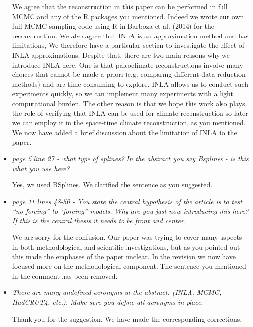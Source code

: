 \documentclass[11pt]{article}
\newcommand{\bl}[1]{\color{red}\textbf{[Bo: #1]}\normalcolor}
\begin{document}
\begin{itemize}
We agree that the reconstruction in this paper can be performed in full MCMC and any of the R packages you mentioned. Indeed we wrote our own full MCMC sampling code using R in Barboza et al. (2014) for the reconstruction. We also agree that INLA is an approximation method and has limitations, We therefore have a particular section to investigate the effect of INLA approximations. Despite that,  there are two main reasons why we introduce INLA here. One is that paleoclimate reconstructions involve many choices that cannot be made a priori (e.g. comparing different data reduction methods) and are time-consuming to explore. INLA allows us to conduct such experiments quickly, so we can implement many experiments with a light computational burden. The other reason is that we hope this work also plays the role of verifying that INLA can be used for climate reconstruction so later we can employ it in the space-time climate reconstruction, as you mentioned. We now have added a brief discussion about the limitation of INLA to the paper.


\item \textit{page 5 line 27 - what type of splines? In the abstract you say Bsplines - is this what you use here?}

Yes, we used BSplines. We clarified the sentence as you suggested.

\item \textit{page 11 lines 48-50 - You state the central hypothesis of the
    article is to test “no-forcing” to “forcing” models. Why are you just now
    introducing this here? If this is the central thesis it needs to be front
    and center.}

We are sorry for the confusion. Our paper was trying to cover many aspects in both methodological and scientific investigations, but as you pointed out this made the emphases of the paper unclear. In the revision we now have focused more on the methodological component. The sentence you mentioned in the comment has been removed.  


\item \textit{There are many undefined acronyms in the abstract. (INLA, MCMC,
    HadCRUT4, etc.). Make sure you define all acronyms in place.}

Thank you for the suggestion. We have made the corresponding corrections.


\end{itemize}



\end{document}
